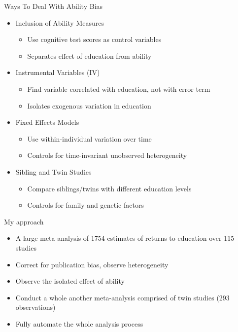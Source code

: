 \documentclass{beamer} %
\begin{document}
\begin{frame}{Ways To Deal With Ability Bias}

    \begin{itemize}
        \item<1-> Inclusion of Ability Measures
              \begin{itemize}
                  \item<2-> Use cognitive test scores as control variables
                  \item<2-> Separates effect of education from ability
              \end{itemize}
        \item<3-> Instrumental Variables (IV)
              \begin{itemize}
                  \item<4-> Find variable correlated with education, not with error term
                  \item<4-> Isolates exogenous variation in education
              \end{itemize}
        \item<5-> Fixed Effects Models
              \begin{itemize}
                  \item<6-> Use within-individual variation over time
                  \item<6-> Controls for time-invariant unobserved heterogeneity
              \end{itemize}
        \item<7-> Sibling and Twin Studies
              \begin{itemize}
                  \item<8-> Compare siblings/twins with different education levels
                  \item<8-> Controls for family and genetic factors
              \end{itemize}
    \end{itemize}

\end{frame}

\begin{frame}{My approach}

    \begin{itemize}
        \item<1-> A large meta-analysis of 1754 estimates of returns to education over 115 studies
        \item<2-> Correct for publication bias, observe heterogeneity
        \item<3-> Observe the isolated effect of ability
        \item<4-> Conduct a whole another meta-analysis comprised of twin studies (293 observations)
        \item<5-> Fully automate the whole analysis process
    \end{itemize}

\end{frame}
\end{document}
